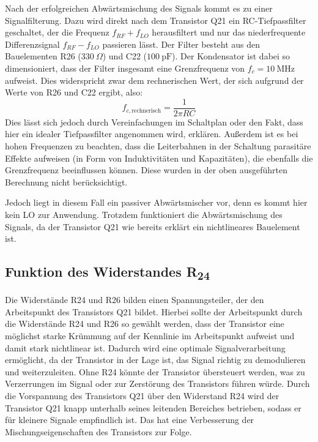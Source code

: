 Nach der erfolgreichen Abwärtsmischung des Signals kommt es zu einer Signalfilterung. Dazu wird direkt nach dem Transistor Q21 ein RC-Tiefpassfilter geschaltet, der die Frequenz $f_{RF} + f_{LO}$ herausfiltert und nur das niederfrequente Differenzsignal $f_{RF} - f_{LO}$ passieren lässt. Der Filter besteht aus den Bauelementen R26 ($330~\Omega$) und C22 ($100~\mathrm{pF}$). Der Kondensator ist dabei so dimensioniert, dass der Filter insgesamt eine Grenzfrequenz von $f_{c} = 10~\mathrm{MHz}$ aufweist. Dies widerspricht zwar dem rechnerischen Wert, der sich aufgrund der Werte von R26 und C22 ergibt, also:
\begin{equation}
    f_{c, \text{rechnerisch}} = \frac{1}{2\pi R C}
\end{equation}
Dies lässt sich jedoch durch Vereinfachungen im Schaltplan oder den Fakt, dass hier ein idealer Tiefpassfilter angenommen wird, erklären. Außerdem ist es bei hohen Frequenzen zu beachten, dass die Leiterbahnen in der Schaltung parasitäre Effekte aufweisen (in Form von Induktivitäten und Kapazitäten), die ebenfalls die Grenzfrequenz beeinflussen können. Diese wurden in der oben ausgeführten Berechnung nicht berücksichtigt.

Jedoch liegt in diesem Fall ein passiver Abwärtsmischer vor, denn es kommt hier kein \ac{LO} zur Anwendung. Trotzdem funktioniert die Abwärtsmischung des Signals, da der Transistor Q21 wie bereits erklärt ein nichtlineares Bauelement ist. 


\subsection{Funktion des Widerstandes R\textsubscript{24}}
Die Widerstände R24 und R26 bilden einen Spannungsteiler, der den Arbeitspunkt des Transistors Q21 bildet. Hierbei sollte der Arbeitspunkt durch die Widerstände R24 und R26 so gewählt werden, dass der Transistor eine möglichst starke Krümmung auf der Kennlinie im Arbeitspunkt aufweist und damit stark nichtlinear ist. Dadurch wird eine optimale Signalverarbeitung ermöglicht, da der Transistor in der Lage ist, das Signal richtig zu demodulieren und weiterzuleiten. Ohne R24 könnte der Transistor übersteuert werden, was zu Verzerrungen im Signal oder zur Zerstörung des Transistors führen würde.
Durch die Vorspannung des Transistors Q21 über den Widerstand R24 wird der Transistor Q21 knapp unterhalb seines leitenden Bereiches betrieben, sodass er für kleinere Signale empfindlich ist. Das hat eine Verbesserung der Mischungseigenschaften des Transistors zur Folge.

